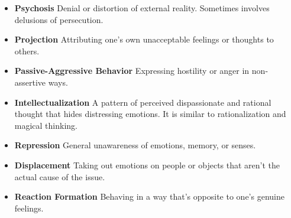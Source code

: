 \documentclass[12pt,letterpaper]{article}
\begin{document}
\begin{itemize}
    \item \textbf{Psychosis} Denial or distortion of external reality. Sometimes involves delusions of persecution.
    
    \item \textbf{Projection} Attributing one's own unacceptable feelings or thoughts to others.
    \item \textbf{Passive-Aggressive Behavior} Expressing hostility or anger in non-assertive ways.
    
    \item \textbf{Intellectualization} A pattern of perceived dispassionate and rational thought that hides distressing emotions. It is similar to rationalization and magical thinking.
    \item \textbf{Repression} General unawareness of emotions, memory, or senses.
    \item \textbf{Displacement} Taking out emotions on people or objects that aren't the actual cause of the issue.
    \item \textbf{Reaction Formation} Behaving in a way that's opposite to one's genuine feelings.
\end{itemize}
\end{document}
